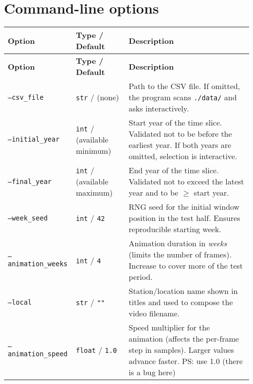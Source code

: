 \documentclass[11pt,a4paper]{article}
\begin{document}
\section{Command-line options}
\begin{longtable}{@{}p{4cm}p{3cm}p{8cm}@{}}
\toprule
\textbf{Option} & \textbf{Type / Default} & \textbf{Description}\\
\midrule
\endfirsthead
\toprule
\textbf{Option} & \textbf{Type / Default} & \textbf{Description}\\
\midrule
\endhead
\bottomrule
\endfoot

\texttt{--csv\_file} &
\texttt{str} / (none) &
Path to the CSV file. If omitted, the program scans \texttt{./data/} and asks interactively.\\[0.3em]

\texttt{--initial\_year} &
\texttt{int} / (available minimum) &
Start year of the time slice. Validated not to be before the earliest year. If both years are omitted, selection is interactive.\\[0.3em]

\texttt{--final\_year} &
\texttt{int} / (available maximum) &
End year of the time slice. Validated not to exceed the latest year and to be $\ge$ start year.\\[0.3em]

\texttt{--week\_seed} &
\texttt{int} / \texttt{42} &
RNG seed for the initial window position in the test half. Ensures reproducible starting week.\\[0.3em]

\texttt{--animation\_weeks} &
\texttt{int} / \texttt{4} &
Animation duration in \emph{weeks} (limits the number of frames). Increase to cover more of the test period.\\[0.3em]

\texttt{--local} &
\texttt{str} / \texttt{""} &
Station/location name shown in titles and used to compose the video filename.\\[0.3em]

\texttt{--animation\_speed} &
\texttt{float} / \texttt{1.0} &
Speed multiplier for the animation (affects the per-frame step in samples). Larger values advance faster. PS: use 1.0 (there is a bug here)\\

\end{longtable}
\end{document}
